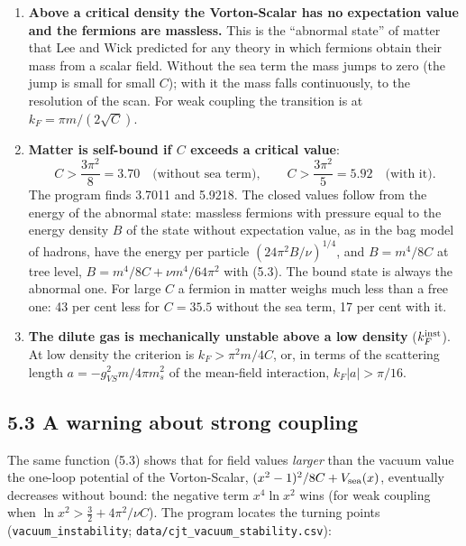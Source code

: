 \documentclass[
  10pt,
]{article}
\providecommand{\tightlist}{%
  \setlength{\itemsep}{0pt}\setlength{\parskip}{0pt}}
\begin{document}
\begin{enumerate}
\def\labelenumi{\arabic{enumi}.}
\tightlist
\item
  \textbf{Above a critical density the Vorton-Scalar has no expectation
  value and the fermions are massless.} This is the ``abnormal state''
  of matter that Lee and Wick predicted for any theory in which fermions
  obtain their mass from a scalar field. Without the sea term the mass
  jumps to zero (the jump is small for small \(C\)); with it the mass
  falls continuously, to the resolution of the scan. For weak coupling
  the transition is at \(k_F=\pi m/(2\sqrt C)\).
\item
  \textbf{Matter is self-bound if \(C\) exceeds a critical value}:
  \[C>\frac{3\pi^2}{8}=3.70\quad\text{(without sea term)},\qquad C>\frac{3\pi^2}{5}=5.92\quad\text{(with it)}.\]
  The program finds 3.7011 and 5.9218. The closed values follow from the
  energy of the abnormal state: massless fermions with pressure equal to
  the energy density \(B\) of the state without expectation value, as in
  the bag model of hadrons, have the energy per particle
  \((24\pi^2B/\nu)^{1/4}\), and \(B=m^4/8C\) at tree level,
  \(B=m^4/8C+\nu m^4/64\pi^2\) with (5.3). The bound state is always the
  abnormal one. For large \(C\) a fermion in matter weighs much less
  than a free one: 43 per cent less for \(C=35.5\) without the sea term,
  17 per cent with it.
\item
  \textbf{The dilute gas is mechanically unstable above a low density}
  (\(k_F^{\rm inst}\)). At low density the criterion is
  \(k_F>\pi^2m/4C\), or, in terms of the scattering length
  \(a=-g_{VS}^2m/4\pi m_s^2\) of the mean-field interaction,
  \(k_F|a|>\pi/16\).
\end{enumerate}

\hypertarget{a-warning-about-strong-coupling}{%
\subsection{5.3 A warning about strong
coupling}\label{a-warning-about-strong-coupling}}

The same function (5.3) shows that for field values \emph{larger} than
the vacuum value the one-loop potential of the Vorton-Scalar,
\((x^2-1)^2/8C+V_{\rm sea}(x)\), eventually decreases without bound: the
negative term \(x^4\ln x^2\) wins (for weak coupling when
\(\ln x^2>\tfrac32+4\pi^2/\nu C\)). The program locates the turning
points (\texttt{vacuum\_instability};
\texttt{data/cjt\_vacuum\_stability.csv}):
\end{document}
